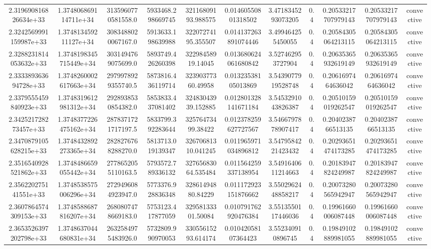 \begin{table}
\begin{tabular}{ccccccccccc}
2.319690816826634e+33 & 1.374806869114711e+34 & 3135960770581558.0 & 5933468.298669745 & 32116809193.988575 & 0.01460550801318502 & 3.4718345293073205 & 0.4 & 0.20533217707979143 & 0.20533217707979143 & convective \\
2.3242569991159987e+33 & 1.374813459211127e+34 & 3083488020067167.0 & 5913633.198639988 & 32207274195.355507 & 0.014137263891074446 & 3.499464255450055 & 0.4 & 0.20584305064213115 & 0.20584305064213115 & convective \\
2.3288231814053632e+33 & 1.3748198345715449e+34 & 3031494769075699.0 & 5893749.426260398 & 32298458919.14045 & 0.013680624061680842 & 3.527462953727904 & 0.4 & 0.20635365932619149 & 0.20635365932619149 & convective \\
2.333389363694728e+33 & 1.3748260002617663e+34 & 2979978929355740.5 & 5873816.436119714 & 32390377360.49958 & 0.01323538105013869 & 3.5439077919528748 & 0.4 & 0.2061697464636042 & 0.2061697464636042 & convective \\
2.3379555459840923e+33 & 1.3748319612981312e+34 & 2928938530854382.0 & 5853833.437081402 & 32483043939.152885 & 0.012801328141671184 & 3.5453291043826387 & 0.4 & 0.20510159019262547 & 0.20510159019262547 & convective \\
2.342521728273457e+33 & 1.3748377226475162e+34 & 2878371721717197.5 & 5833799.392283644 & 32576473499.38422 & 0.012378259627727567 & 3.5466797878907417 & 0.4 & 0.2040238766513135 & 0.2040238766513135 & convective \\
2.3470879105628215e+33 & 1.3748432892273365e+34 & 2828276768288270.0 & 5813713.019139347 & 32670681310.041245 & 0.011965971034896812 & 3.5479584221423432 & 0.4 & 0.20293651474173285 & 0.20293651474173285 & convective \\
2.3516540928521862e+33 & 1.3748486659055442e+34 & 2778652055110163.5 & 5793572.789336132 & 32765683064.535484 & 0.011564259337138954 & 3.5491640611214663 & 0.4 & 0.20183947824249987 & 0.20183947824249987 & convective \\
2.356220275141551e+33 & 1.3748538575006296e+34 & 2729496084923947.0 & 5773376.928836348 & 32861494880.84229 & 0.011172923151876662 & 3.5502962448858217 & 0.4 & 0.20073280565942947 & 0.20073280565942947 & convective \\
2.3607864574309153e+33 & 1.3748588687816207e+34 & 2680807478669183.0 & 5753123.417877059 & 32958133301.50084 & 0.010791762920476384 & 3.5513550117446036 & 0.4 & 0.19961660006087448 & 0.19961660006087448 & convective \\
2.3653526397202798e+33 & 1.3748637044680831e+34 & 2632584975483926.0 & 5732809.990970053 & 33055615293.614174 & 0.01042058107364423 & 3.552340910896745 & 0.4 & 0.19849102889981055 & 0.19849102889981055 & convective \\

\end{tabular}
\end{table}

